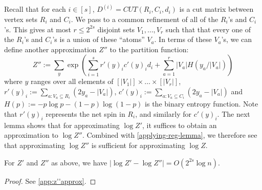 \documentclass[final, 12pt]{colt2018}
\theoremstyle{definition}
\theoremstyle{plain}
\begin{document}
Recall that for each $i\in[s]$, $D^{(i)} = CUT(R_i,C_i,d_i)$ is a cut
matrix between vertex sets $R_i$ and $C_i$.
We pass to a common refinement of all of the $R_i$'s and $C_i$'s. This
gives at most $r \le 2^{2s}$ disjoint sets $V_1, \ldots, V_r$ such that
that every one of the $R_i$'s and $C_i$'s is a union of these ``atoms'' $V_a$. 
In terms of these $V_a$'s, we can define another approximation $Z''$ to the partition function: 
\[
Z'':=\sum_{y}\exp\left(\sum_{i=1}^{s}r'(y)_{i}c'(y)_{i}d_{i}+\sum_{a=1}^{r}|V_{a}|H(y_{a}/|V_{a}|)\right)
\]
where $y$ ranges over all elements of $[|V_{1}|]\times\dots\times[|V_{r}|]$,
$r'(y)_{i}:=\sum_{a\colon V_{a}\subseteq R_{i}}(2y_{a}-|V_{a}|)$,
$c'(y)_{i}:=\sum_{a\colon V_{a}\subseteq C_{i}}(2y_{a}-|V_{a}|)$
and $H(p):=-p\log p-(1-p)\log(1-p)$ is the binary entropy function. 
Note that $r'(y)_{i}$ represents the net spin in $R_{i}$, and similarly for $c'(y)_{i}$. The next lemma shows that for approximating $\log{Z'}$, it suffices to obtain an approximation to $\log{Z''}$. Combined with \cref{applying-reg-lemma}, we therefore see that approximating $\log{Z''}$ is sufficient for approximating $\log{Z}$.  

\begin{lemma}\label{z''-approx}
For $Z'$ and $Z''$ as above, we have $|\log Z' - \log Z''| = O(2^{2s} \log n)$.
\end{lemma}
\begin{proof}
See \cref{app:z''approx}. 

\end{proof}
\end{document}
